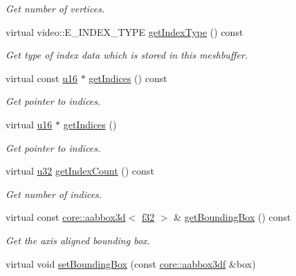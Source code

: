 \begin{DoxyCompactItemize}
\begin{DoxyCompactList}\small\item\em Get number of vertices. \end{DoxyCompactList}\item 
virtual video\+::\+E\+\_\+\+I\+N\+D\+E\+X\+\_\+\+T\+Y\+PE \hyperlink{classirr_1_1scene_1_1CMeshBuffer_aa183491690fa47b4697bbfcc7902301c}{get\+Index\+Type} () const
\begin{DoxyCompactList}\small\item\em Get type of index data which is stored in this meshbuffer. \end{DoxyCompactList}\item 
virtual const \hyperlink{namespaceirr_ae9f8ec82692ad3b83c21f555bfa70bcc}{u16} $\ast$ \hyperlink{classirr_1_1scene_1_1CMeshBuffer_a23af7e8ffb2ba674d1dd4448cea288bf}{get\+Indices} () const
\begin{DoxyCompactList}\small\item\em Get pointer to indices. \end{DoxyCompactList}\item 
virtual \hyperlink{namespaceirr_ae9f8ec82692ad3b83c21f555bfa70bcc}{u16} $\ast$ \hyperlink{classirr_1_1scene_1_1CMeshBuffer_a34a85f4868776d4cf312cdece5326c89}{get\+Indices} ()
\begin{DoxyCompactList}\small\item\em Get pointer to indices. \end{DoxyCompactList}\item 
virtual \hyperlink{namespaceirr_a0416a53257075833e7002efd0a18e804}{u32} \hyperlink{classirr_1_1scene_1_1CMeshBuffer_ac5585f4983423a4ba1f4ab4aba112c95}{get\+Index\+Count} () const
\begin{DoxyCompactList}\small\item\em Get number of indices. \end{DoxyCompactList}\item 
virtual const \hyperlink{classirr_1_1core_1_1aabbox3d}{core\+::aabbox3d}$<$ \hyperlink{namespaceirr_a0277be98d67dc26ff93b1a6a1d086b07}{f32} $>$ \& \hyperlink{classirr_1_1scene_1_1CMeshBuffer_a759863b44c024f79747019f492a5c7cf}{get\+Bounding\+Box} () const
\begin{DoxyCompactList}\small\item\em Get the axis aligned bounding box. \end{DoxyCompactList}\item 
virtual void \hyperlink{classirr_1_1scene_1_1CMeshBuffer_ab5a21d48a5af73f1ef880a48c3798a67}{set\+Bounding\+Box} (const \hyperlink{namespaceirr_1_1core_a60f4b4c744aba55f10530d503c6ecb04}{core\+::aabbox3df} \&box)

\end{DoxyCompactItemize}
